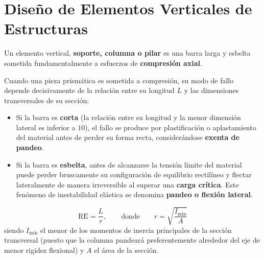 \section{Diseño de Elementos Verticales de Estructuras}

Un elemento vertical, \textbf{soporte, columna o pilar} es una barra larga y esbelta sometida fundamentalmente a esfuerzos de \textbf{compresión axial}.

Cuando una pieza prismática es sometida a compresión, su modo de fallo depende decisivamente de la relación entre su longitud $L$ y las dimensiones transversales de su sección:
\begin{itemize}
    \item Si la barra es \textbf{corta} (la relación entre su longitud y la menor dimensión lateral es inferior a $10$), el fallo se produce por plastificación o aplastamiento del material antes de perder su forma recta, considerándose \textbf{exenta de pandeo}.
    \item Si la barra es \textbf{esbelta}, antes de alcanzarse la tensión límite del material puede perder bruscamente su configuración de equilibrio rectilíneo y flectar lateralmente de manera irreversible al superar una \textbf{carga crítica}. Este fenómeno de inestabilidad elástica se denomina \textbf{pandeo o flexión lateral}.
\end{itemize}

\begin{equation}
    \text{RE} = \frac{L}{r}, \qquad \text{donde} \qquad r = \sqrt{\frac{I_{\text{mín}}}{A}}
    \label{eq:t9_esbeltez}
\end{equation}
siendo $I_{\text{mín}}$ el menor de los momentos de inercia principales de la sección transversal (puesto que la columna pandeará preferentemente alrededor del eje de menor rigidez flexional) y $A$ el área de la sección.

